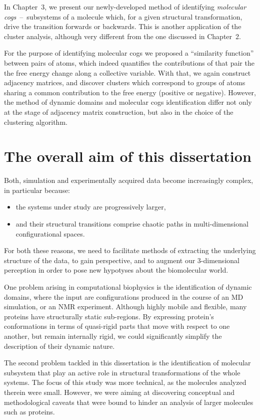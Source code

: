 \documentclass[a4paper,11pt,twoside]{book}%
\begin{document}
In Chapter~3, we present our newly-developed method of identifying \emph{molecular cogs}~--~subsystems of a molecule which, for a given structural transformation, drive the transition forwards or backwards.
This is another application of the cluster analysis, although very different from the one discussed in Chapter~2.

For the purpose of identifying molecular cogs we proposed a ``similarity function'' between pairs of atoms, which indeed quantifies the contributions of that pair the the free energy change along a collective variable.
With that, we again construct adjacency matrices, and discover clusters which correspond to groups of atoms sharing a common contribution to the free energy (positive or negative).
However, the method of dynamic domains and molecular cogs identification differ not only at the stage of adjacency matrix construction, but also in the choice of the clustering algorithm.

\section{The overall aim of this dissertation}

Both, simulation and experimentally acquired data become increasingly complex, in particular because:
\begin{itemize}
 \item the systems under study are progressively larger,
 \item and their structural transitions comprise chaotic paths in multi-dimensional configurational spaces.
\end{itemize}
For both these reasons, we need to facilitate methods of extracting the underlying structure of the data, to gain perspective, and to augment our 3-dimensional perception in order to pose new hypotyses about the biomolecular world.

One problem arising in computational biophysics is the identification of dynamic domains, where the input are configurations produced in the course of an MD simulation, or an NMR experiment.
Although highly mobile and flexible, many proteins have structurally static sub-regions.
By expressing protein's conformations in terms of quasi-rigid parts that move with respect to one another, but remain internally  rigid, we could significantly simplify the description of their dynamic nature.

The second problem tackled in this dissertation is the identification of molecular subsystem that play an active role in structural transformations of the whole systems.
The focus of this study was more technical, as the molecules analyzed therein were small.
However, we were aiming at discovering conceptual and methodological caveats that were bound to hinder an analysis of larger molecules such as proteins.
\end{document}

